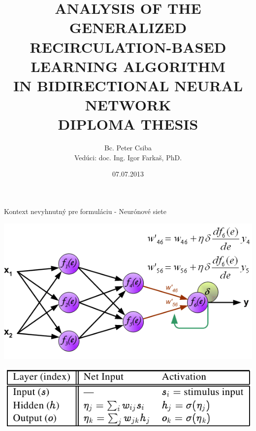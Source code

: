 \documentclass[xcolor=dvipsnames]{beamer}
\title[GeneRec Analysis]{
ANALYSIS OF THE GENERALIZED \\
RECIRCULATION-BASED LEARNING ALGORITHM \\
IN BIDIRECTIONAL NEURAL NETWORK \\
\vspace{3cm}
DIPLOMA THESIS
}
\author[P. Csiba]{Bc. Peter Csiba \\ Vedúci: doc. Ing. Igor Farkaš, PhD.}
\institute[FMFI UK]{
  UNIVERZITA KOMENSKÉHO V BRATISLAVE\\
  FAKULTA MATEMATIKY, FYZIKY A INFORMATIKY
}
\date{07.07.2013}
\begin{document}
\begin{frame}[plain]
  \titlepage
\end{frame}



\begin{frame}{Kontext nevyhnutný pre formuláciu - Neurónové siete}
  
  \begin{center} 
    \includegraphics[scale=0.5]{img/bp.png}
  \end{center} 
  \begin{center} 
    \includegraphics[scale=0.5]{img/table_bp.png}
  \end{center} 
\end{frame}
\end{document}
